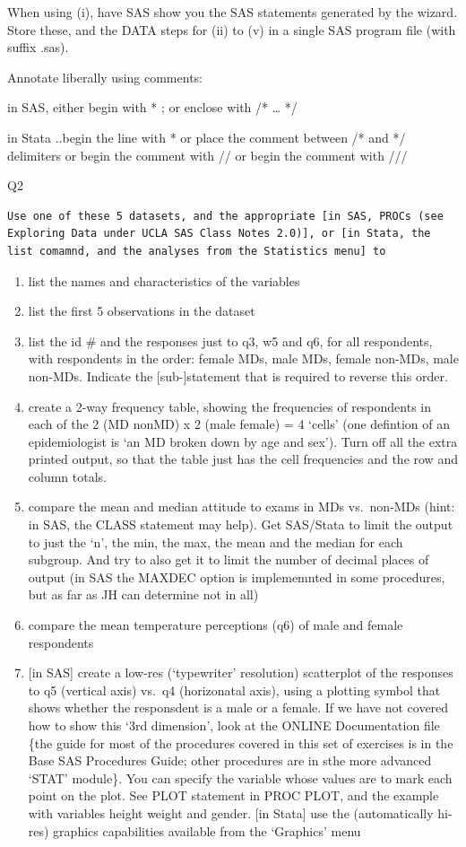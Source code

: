 \documentclass[]{book}
\begin{document}
When using (i), have SAS show you the SAS statements generated by the wizard. Store these, and the DATA steps for (ii) to (v) in a single SAS program file (with suffix .sas).

Annotate liberally using comments:

in SAS, either begin with * ; or enclose with /* \ldots{} */

in Stata ..begin the line with * or place the comment between /* and */ delimiters or begin the comment with // or begin the comment with ///

Q2

\begin{verbatim}
Use one of these 5 datasets, and the appropriate [in SAS, PROCs (see Exploring Data under UCLA SAS Class Notes 2.0)], or [in Stata, the list comamnd, and the analyses from the Statistics menu] to
\end{verbatim}

\begin{enumerate}
\def\labelenumi{(\roman{enumi})}
\item
  list the names and characteristics of the variables
\item
  list the first 5 observations in the dataset
\item
  list the id \# and the responses just to q3, w5 and q6, for all respondents, with respondents in the order: female MDs, male MDs, female non-MDs, male non-MDs. Indicate the {[}sub-{]}statement that is required to reverse this order.
\item
  create a 2-way frequency table, showing the frequencies of respondents in each of the 2 (MD nonMD) x 2 (male female) = 4 `cells' (one defintion of an epidemiologist is `an MD broken down by age and sex'). Turn off all the extra printed output, so that the table just has the cell frequencies and the row and column totals.
\item
  compare the mean and median attitude to exams in MDs vs.~non-MDs (hint: in SAS, the CLASS statement may help). Get SAS/Stata to limit the output to just the `n', the min, the max, the mean and the median for each subgroup. And try to also get it to limit the number of decimal places of output (in SAS the MAXDEC option is implememnted in some procedures, but as far as JH can determine not in all)
\item
  compare the mean temperature perceptions (q6) of male and female respondents
\item
  {[}in SAS{]} create a low-res (`typewriter' resolution) scatterplot of the responses to q5 (vertical axis) vs.~q4 (horizonatal axis), using a plotting symbol that shows whether the responsdent is a male or a female. If we have not covered how to show this `3rd dimension', look at the ONLINE Documentation file \{the guide for most of the procedures covered in this set of exercises is in the Base SAS Procedures Guide; other procedures are in sthe more advanced `STAT' module\}. You can specify the variable whose values are to mark each point on the plot. See PLOT statement in PROC PLOT, and the example with variables height weight and gender.
  {[}in Stata{]} use the (automatically hi-res) graphics capabilities available from the `Graphics' menu
\end{enumerate}
\end{document}
